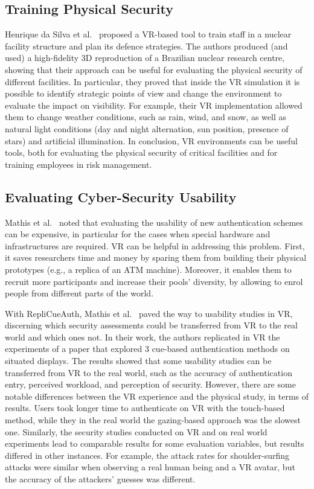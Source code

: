 \documentclass[journal]{IEEEtran}
\begin{document}
\subsection{Training Physical Security}
Henrique da Silva et al.~\cite{henriquedasilva2015} proposed a VR-based tool to train staff in a nuclear facility structure and plan its defence strategies. The authors produced (and used) a high-fidelity 3D reproduction of a Brazilian nuclear research centre, showing that their approach can be useful for evaluating the physical security of different facilities. In particular, they proved that inside the VR simulation it is possible to identify strategic points of view and change the environment to evaluate the impact on visibility. For example, their VR implementation allowed them to change weather conditions, such as rain, wind, and snow, as well as natural light conditions (day and night alternation, sun position, presence of stars) and artificial illumination. In conclusion, VR environments can be useful tools, both for evaluating the physical security of critical facilities and for training employees in risk management.

\subsection{Evaluating Cyber-Security Usability}
Mathis et al.~\cite{mathis2021repli,mathis2021virsec} noted that evaluating the usability of new authentication schemes can be expensive, in particular for the cases when special hardware and infrastructures are required. VR can be helpful in addressing this problem. First, it saves researchers time and money by sparing them from building their physical prototypes (e.g., a replica of an ATM machine). Moreover, it enables them to recruit more participants and increase their pools' diversity, by allowing to enrol people from different parts of the world. 

With RepliCueAuth, Mathis et al.~\cite{mathis2021repli} paved the way to usability studies in VR, discerning which security assessments could be transferred from VR to the real world and which ones not. In their work, the authors replicated in VR the experiments of a paper that explored 3 cue-based authentication methods on situated displays. The results showed that some usability studies can be transferred from VR to the real world, such as the accuracy of authentication entry, perceived workload, and perception of security. However, there are some notable differences between the VR experience and the physical study, in terms of results. Users took longer time to authenticate on VR with the touch-based method, while they in the real world the gazing-based approach was the slowest one. Similarly, the security studies conducted on VR and on real world experiments lead to comparable results for some evaluation variables, but results differed in other instances. For example, the attack rates for shoulder-surfing attacks were similar when observing a real human being and a VR avatar, but the accuracy of the attackers' guesses was different. 
\end{document}
